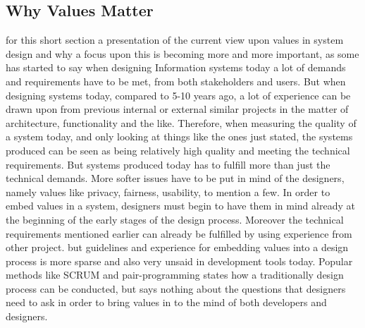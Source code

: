 \subsection{Why Values Matter}
for this short section a presentation of the current view upon values in system design and why a focus upon this is becoming more and more important, as some has started to say
when designing Information systems today a lot of demands and requirements have to be met, from both stakeholders and users. But when designing systems today, compared to 5-10 years ago, a lot of experience can be drawn upon from previous internal or external similar projects in the matter of architecture, functionality and the like. Therefore, when measuring the quality of a system today, and only looking at things like the ones just stated, the systems produced can be seen as being relatively high quality and meeting the technical requirements. But systems produced today has to fulfill more than just the technical demands. More softer issues have to be put in mind of the designers, namely values like privacy, fairness, usability, to mention a few. In order to embed values in a system, designers must begin to have them in mind already at the beginning of the early stages of the design process. Moreover the technical requirements mentioned earlier can already be fulfilled by using experience from other project. but guidelines and experience for embedding values into a design process is more sparse and also very unsaid in development tools today. Popular methods like SCRUM and pair-programming states how a traditionally design process can be conducted, but says nothing about the questions that designers need to ask in order to bring values in to the mind of both developers and designers. 

